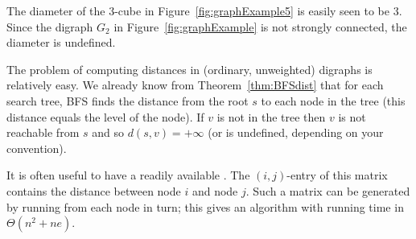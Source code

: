 \begin{Example}

The diameter of the $3$-cube in Figure~\ref{fig:graphExample5} is easily
seen to be $3$. Since the digraph $G_2$ in Figure~\ref{fig:graphExample}
is not strongly connected, the diameter is undefined.  

\end{Example}

The problem of computing distances in (ordinary, unweighted) digraphs is
relatively easy. We already know from Theorem~\ref{thm:BFSdist} that
for each search tree, BFS finds the distance from the root $s$ to each
node in the tree (this distance equals the level of the node). If $v$
is not in the tree then $v$ is not reachable from $s$ and so $d(s,v) =
+\infty$ (or is undefined,  depending on your convention). 

It is often useful to have a readily available .
The $(i, j)$-entry of this matrix contains the distance between node $i$
and node $j$. Such a matrix can be generated by running
from each node in turn; this gives an algorithm with running time in
$\Theta(n^2+ne)$.


